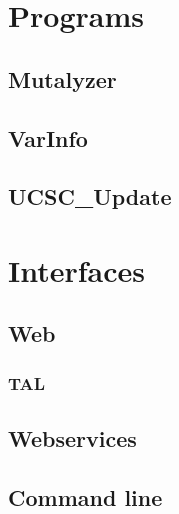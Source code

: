 \documentclass{article}
\theoremstyle{definition}
\begin{document}
\section{Programs}\label{sec:programs}
\subsection{Mutalyzer}\label{subsec:mutalyzer}
\subsection{VarInfo}\label{subsec:varinfo}
\subsection{UCSC\_Update}\label{subsec:ucsc_update}

\section{Interfaces}\label{sec:interfaces}
\subsection{Web}\label{subsec:webinterface}
\subsubsection{TAL}
\subsection{Webservices}\label{subsec:webservinterface}
\subsection{Command line}\label{subsec:commandline}

{}

\end{document}
